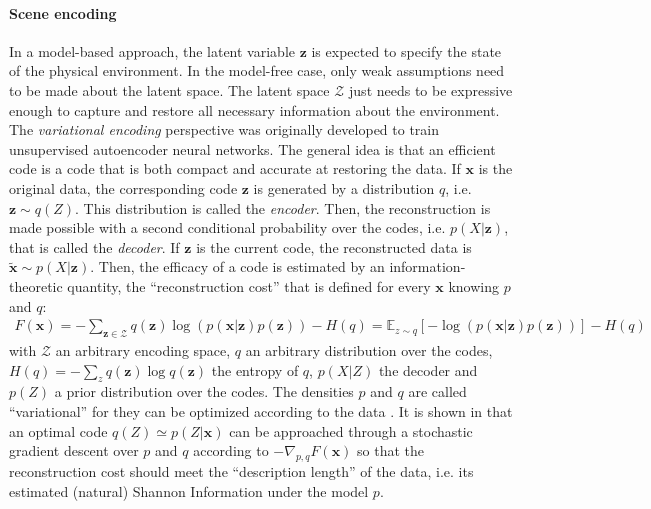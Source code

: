 \documentclass{article}
\begin{document}
\paragraph{Scene encoding}\label{sec:encoding}
In a model-based approach, the latent variable $\boldsymbol{z}$ is expected to specify the state of the physical environment. In the model-free case, only weak assumptions need to be made about the latent space.  The latent space $\mathcal{Z}$ just needs to be expressive enough to capture and restore all necessary information about the environment.  The \emph{variational encoding} perspective \cite{hinton1994autoencoders} was originally developed 
to train unsupervised autoencoder neural networks. The general idea is that an efficient code 
is a code that is both compact and accurate at restoring the data. 
If $\boldsymbol{x}$ is the original data, the corresponding code $\boldsymbol{z}$ is generated by a distribution $q$, i.e. $\boldsymbol{z} \sim q(Z)$. This distribution is called the \emph{encoder}. Then, the reconstruction is made possible with a second conditional probability over the codes, i.e. $p(X|\boldsymbol{z})$, that is called the \emph{decoder}. If $\boldsymbol{z}$ is the current code, the reconstructed data is $\tilde{\boldsymbol{x}} \sim p(X|\boldsymbol{z})$. 
Then, the efficacy of a code is estimated by an information-theoretic quantity, the ``reconstruction cost'' that is defined for every $\boldsymbol{x}$ knowing $p$ and $q$:
\begin{align}
F(\boldsymbol{x}) = - \sum_{\boldsymbol{z} \in \mathcal{Z}} q(\boldsymbol{z}) \log (p(\boldsymbol{x}|\boldsymbol{z})p(\boldsymbol{z})) - H(q)
= \mathbb{E}_{z\sim q} \left[-\log (p(\boldsymbol{x}|\boldsymbol{z})p(\boldsymbol{z}))\right] - H(q)
\label{eq:FEP-energy}
\end{align}
with $\mathcal{Z}$ an arbitrary encoding space, $q$ an arbitrary distribution over the codes, $H(q) = -\sum_z q(\boldsymbol{z}) \log q(\boldsymbol{z})$ the entropy of $q$, $p(X|Z)$ the decoder and $p(Z)$ a prior distribution over the codes.
The densities $p$ and $q$ are called ``variational'' for they can be optimized according to the data \cite{hinton2006fast,kingma2013auto}.  
It is shown in \cite{kingma2013auto} that an optimal code $q(Z)\simeq p(Z|\boldsymbol{x})$ can be approached through a stochastic gradient descent over $p$ and $q$ according to $-\nabla_{p,q} F(\boldsymbol{x}) $	so that the reconstruction cost should meet the ``description length'' of the data, i.e. its estimated (natural) Shannon Information under the model $p$.
\end{document}

